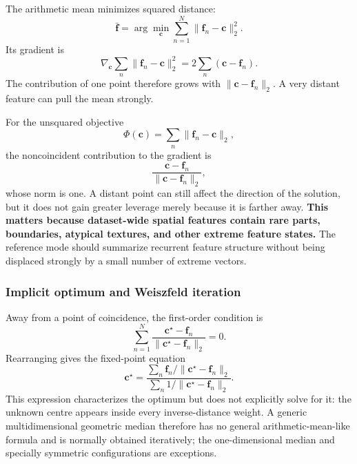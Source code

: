 The arithmetic mean minimizes squared distance:
\begin{equation}
    \bar{\bm f}
    =\arg\min_{\bm c}
      \sum_{n=1}^{N}\|\bm f_n-\bm c\|_2^2.
\end{equation}
Its gradient is
\begin{equation}
    \nabla_{\bm c}\sum_n\|\bm f_n-\bm c\|_2^2
    =2\sum_n(\bm c-\bm f_n).
\end{equation}
The contribution of one point therefore grows with
$\|\bm c-\bm f_n\|_2$. A very distant feature can pull the mean strongly.

For the unsquared objective
\begin{equation}
    \Phi(\bm c)=\sum_n\|\bm f_n-\bm c\|_2,
\end{equation}
the noncoincident contribution to the gradient is
\begin{equation}
    \frac{\bm c-\bm f_n}{\|\bm c-\bm f_n\|_2},
\end{equation}
whose norm is one. A distant point can still affect the direction of the
solution, but it does not gain greater leverage merely because it is farther
away. \textbf{This matters because dataset-wide spatial features contain rare
parts, boundaries, atypical textures, and other extreme feature states.} The
reference mode should summarize recurrent feature structure without being
displaced strongly by a small number of extreme vectors.

\subsubsection{Implicit optimum and Weiszfeld iteration}

Away from a point of coincidence, the first-order condition is
\begin{equation}
    \sum_{n=1}^{N}
    \frac{\bm c^\star-\bm f_n}
         {\|\bm c^\star-\bm f_n\|_2}=0.
    \label{eq:geomed-stationarity}
\end{equation}
Rearranging gives the fixed-point equation
\begin{equation}
    \boxed{
    \bm c^\star=
    \frac{\displaystyle\sum_n
          \bm f_n/\|\bm c^\star-\bm f_n\|_2}
         {\displaystyle\sum_n
          1/\|\bm c^\star-\bm f_n\|_2}.}
    \label{eq:geomed-fixed-point}
\end{equation}
This expression characterizes the optimum but does not explicitly solve for it:
the unknown centre appears inside every inverse-distance weight. A generic
multidimensional geometric median therefore has no general
arithmetic-mean-like formula and is normally obtained iteratively; the
one-dimensional median and specially symmetric configurations are exceptions.

